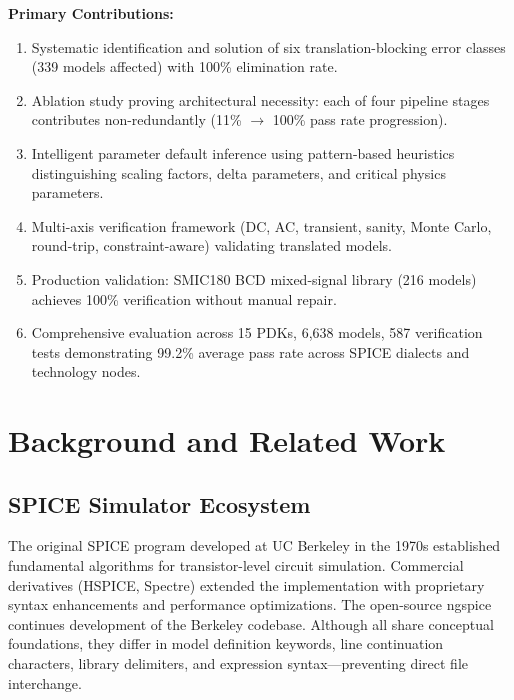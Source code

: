 \documentclass[conference]{IEEEtran}
\begin{document}
\textbf{Primary Contributions:}
\begin{enumerate}
\item Systematic identification and solution of six translation-blocking error classes (339 models affected) with 100\% elimination rate.
\item Ablation study proving architectural necessity: each of four pipeline stages contributes non-redundantly (11\% $\rightarrow$ 100\% pass rate progression).
\item Intelligent parameter default inference using pattern-based heuristics distinguishing scaling factors, delta parameters, and critical physics parameters.
\item Multi-axis verification framework (DC, AC, transient, sanity, Monte Carlo, round-trip, constraint-aware) validating translated models.
\item Production validation: SMIC180 BCD mixed-signal library (216 models) achieves 100\% verification without manual repair.
\item Comprehensive evaluation across 15 PDKs, 6,638 models, 587 verification tests demonstrating 99.2\% average pass rate across SPICE dialects and technology nodes.
\end{enumerate}

\section{Background and Related Work}
\label{sec:background}

\subsection{SPICE Simulator Ecosystem}

The original SPICE program developed at UC Berkeley in the 1970s established fundamental algorithms for transistor-level circuit simulation. Commercial derivatives (HSPICE, Spectre) extended the implementation with proprietary syntax enhancements and performance optimizations. The open-source ngspice continues development of the Berkeley codebase. Although all share conceptual foundations, they differ in model definition keywords, line continuation characters, library delimiters, and expression syntax---preventing direct file interchange.
\end{document}
